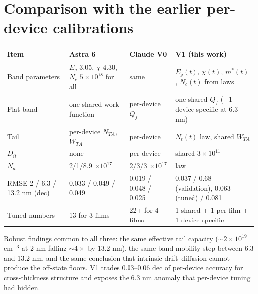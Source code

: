 \documentclass[11pt,a4paper]{article}
\begin{document}
\section{Comparison with the earlier per-device calibrations}
\begin{table}[H]\centering\footnotesize
\begin{tabular}{llll}\toprule
Item & Astra 6 & Claude V0 & V1 (this work)\\\midrule
Band parameters & $E_g$ 3.05, $\chi$ 4.30, $N_c$ $5\times10^{18}$ for all & same & $E_g(t)$, $\chi(t)$, $m^*(t)$, $N_c(t)$ from laws\\
Flat band & one shared work function & per-device $Q_f$ & one shared $Q_f$ (+1 device-specific at 6.3 nm)\\
Tail & per-device $N_{TA}$, $W_{TA}$ & per-device & $N_t(t)$ law, shared $W_{TA}$\\
$D_{it}$ & none & per-device & shared $3\times10^{11}$\\
$N_d$ & 2/1/8.9 $\times10^{17}$ & 2/3/3 $\times10^{17}$ & law\\
RMSE 2 / 6.3 / 13.2 nm (dec) & 0.033 / 0.049 / 0.049 & 0.019 / 0.048 / 0.025 & 0.037 / 0.68 (validation), 0.063 (tuned) / 0.081\\
Tuned numbers & 13 for 3 films & 22+ for 4 films & 1 shared + 1 per film + 1 device-specific\\
\bottomrule\end{tabular}
\end{table}
Robust findings common to all three: the same effective tail capacity ($\sim2\times10^{19}$ cm$^{-3}$ at 2 nm falling $\sim4\times$ by 13.2 nm), the same band-mobility step between 6.3 and 13.2 nm, and the same conclusion that intrinsic drift--diffusion cannot produce the off-state floors. V1 trades 0.03--0.06 dec of per-device accuracy for cross-thickness structure and exposes the 6.3 nm anomaly that per-device tuning had hidden.

\end{document}
